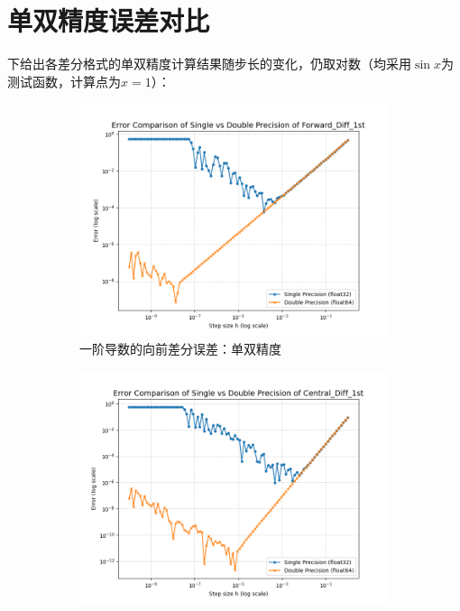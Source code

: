 \documentclass[12pt, a4paper]{article}
\begin{document}
\section{单双精度误差对比}
下给出各差分格式的单双精度计算结果随步长的变化，仍取对数（均采用$\sin x$为测试函数，计算点为$x=1$）：
\begin{figure}[htbp]
    \centering
    \begin{subfigure}[b]{0.45\textwidth} 
        \centering
        \includegraphics[width=\textwidth]{./pictures/Error Comparison of Single vs Double Precision of Forward_Diff_1st.png} 
        \caption{一阶导数的向前差分误差：单双精度}
        \label{fig: ECCF1}
    \end{subfigure}
    \hfill
    \begin{subfigure}[b]{0.45\textwidth} 
        \centering
        \includegraphics[width=\textwidth]{./pictures/Error Comparison of Single vs Double Precision of Central_Diff_1st.png} 

\end{subfigure}
\end{figure}
\end{document}
